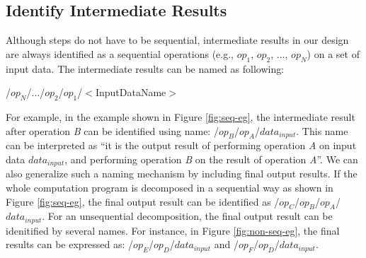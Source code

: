 \documentclass[journal]{IEEEtran}
\begin{document}
\subsection{Identify Intermediate Results}
Although steps do not have to be sequential, intermediate results in our design
are always identified as a sequential operations (e.g., $op_1$, $op_2$, ..., $op_N$) on a
set of input data.  The intermediate results can be named as following:
\begin{center}
/$op_N$/.../$op_2$/$op_1$/$<$InputDataName$>$
\end{center}
For example, in the example shown in Figure \ref{fig:seq-eg}, the intermediate
result after operation {\it B} can be identified using name: /$op_B$/$op_A$/$
data_{input}$.  This name can be interpreted as ``it is the output result of
performing operation {\it A} on input data $data_{input}$, and performing
operation {\it B} on the result of operation {\it A}''.  We can also generalize
such a naming mechanism by including final output results.  If the whole
computation program is decomposed in a sequential way as shown in Figure
\ref{fig:seq-eg}, the final output result can be identified as
/$op_C$/$op_B$/$op_A$/$data_{input}$.  For an unsequential decomposition, the
final output result can be idenitified by several names.  For instance, in
Figure \ref{fig:non-seq-eg}, the final results can be expressed as:
/$op_E$/$op_D$/$data_{input}$ and /$op_F$/$op_D$/$data_{input}$.
\end{document}
